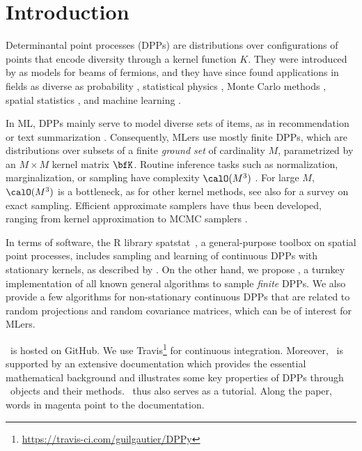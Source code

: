 \section{Introduction} %
\label{sec:introduction}

Determinantal point processes (DPPs) are distributions over configurations of points that encode diversity through a kernel function $K$.
They were introduced by \citet{Mac75} as models for beams of fermions, and they have since found applications in fields as diverse as probability \citep{Sos00, Kon05, HKPV06}, statistical physics \citep{PaBe11}, Monte Carlo methods \citep{BaHa16}, spatial statistics \citep{LaMoRu15}, and machine learning \citep[ML,][]{KuTa12}.

In ML, DPPs mainly serve to model diverse sets of items, as in recommendation \citep{KaDeKo16, GaPaKo16} or text summarization \citep{DuBa18}.
Consequently, MLers  use mostly finite DPPs, which are distributions over subsets of a finite \emph{ground set} of cardinality $M$, parametrized by an $M\times M$ kernel matrix $\bfK$.
Routine inference tasks such as normalization, marginalization, or sampling have complexity $\calO(M^3)$ \citep{KuTa12}.
For large $M$, $\calO(M^3)$ is a bottleneck, as for other kernel methods, see also \citet{TrBaAm18} for a survey on exact sampling.
Efficient approximate samplers have thus been developed, ranging from kernel approximation \citep{AKFT13} to MCMC samplers \citep{AnGhRe16, LiJeSr16c, GaBaVa17}.

In terms of software, the R library \textsf{spatstat}\ \citep{BaTu05}, a general-purpose toolbox on spatial point processes, includes sampling and learning of continuous DPPs with stationary kernels, as described by \citet{LaMoRu15}.
On the other hand, we propose \DPPy, a turnkey implementation of all known general algorithms to sample \emph{finite} DPPs.
We also provide a few algorithms for non-stationary continuous DPPs that are related to random projections and random covariance matrices, which can be of interest for MLers.

\DPPy\ is hosted on GitHub. We use \setcounter{footnote}{5}Travis\footnote{\url{https://travis-ci.com/guilgautier/DPPy}} for continuous integration.
Moreover, \DPPy\ is supported by an extensive documentation which provides the essential mathematical background and illustrates some key properties of DPPs through \DPPy\ objects and their methods.
\DPPy\ thus also serves as a tutorial.
Along the paper, words in magenta point to the documentation.

